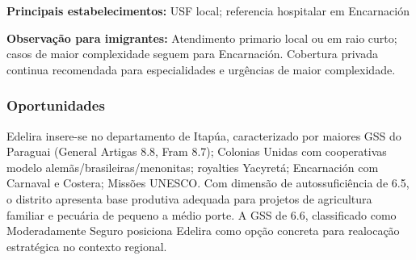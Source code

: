 \textbf{Principais estabelecimentos:} USF local; referencia hospitalar
em Encarnación

\textbf{Observação para imigrantes:} Atendimento primario local ou em
raio curto; casos de maior complexidade seguem para Encarnación.
Cobertura privada continua recomendada para especialidades e urgências
de maior complexidade.
\newpage

\subsubsection*{Oportunidades}\label{oport-edelira-0723}
Edelira insere-se no departamento de Itapúa, caracterizado por maiores GSS do Paraguai (General Artigas 8.8, Fram 8.7); Colonias Unidas com cooperativas modelo alemãs/brasileiras/menonitas; royalties Yacyretá; Encarnación com Carnaval e Costera; Missões UNESCO. Com dimensão de autossuficiência de 6.5, o distrito apresenta base produtiva adequada para projetos de agricultura familiar e pecuária de pequeno a médio porte. A GSS de 6.6, classificado como Moderadamente Seguro posiciona Edelira como opção concreta para realocação estratégica no contexto regional.

